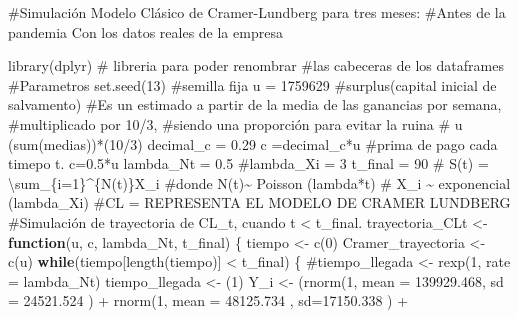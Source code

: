 \documentclass[
  us-letterpaper,
]{scrreprt}
\newenvironment{Shaded}{\begin{snugshade}}{\end{snugshade}}
\newcommand{\AttributeTok}[1]{\textcolor[rgb]{0.40,0.45,0.13}{#1}}
\newcommand{\CommentTok}[1]{\textcolor[rgb]{0.37,0.37,0.37}{#1}}
\newcommand{\ControlFlowTok}[1]{\textcolor[rgb]{0.00,0.23,0.31}{\textbf{#1}}}
\newcommand{\DecValTok}[1]{\textcolor[rgb]{0.68,0.00,0.00}{#1}}
\newcommand{\FloatTok}[1]{\textcolor[rgb]{0.68,0.00,0.00}{#1}}
\newcommand{\FunctionTok}[1]{\textcolor[rgb]{0.28,0.35,0.67}{#1}}
\newcommand{\NormalTok}[1]{\textcolor[rgb]{0.00,0.23,0.31}{#1}}
\newcommand{\OtherTok}[1]{\textcolor[rgb]{0.00,0.23,0.31}{#1}}
\newcommand{\SpecialCharTok}[1]{\textcolor[rgb]{0.37,0.37,0.37}{#1}}
\theoremstyle{plain}
\theoremstyle{plain}
\theoremstyle{definition}
\theoremstyle{remark}
\begin{document}
\begin{Shaded}
\begin{Highlighting}[]
\CommentTok{\#Simulación Modelo Clásico de Cramer{-}Lundberg para tres meses: }
\CommentTok{\#Antes de la pandemia Con los datos reales de la empresa}

\FunctionTok{library}\NormalTok{(dplyr) }\CommentTok{\# libreria para poder renombrar }
\CommentTok{\#las cabeceras de los dataframes}
\CommentTok{\#Parametros}
\FunctionTok{set.seed}\NormalTok{(}\DecValTok{13}\NormalTok{) }\CommentTok{\#semilla fija}
\NormalTok{u }\OtherTok{=} \DecValTok{1759629} \CommentTok{\#surplus(capital inicial de salvamento)}
\CommentTok{\#Es un estimado a partir de la media de las ganancias por semana, }
\CommentTok{\#multiplicado por 10/3, }
\CommentTok{\#siendo una proporción para evitar la ruina}
\CommentTok{\# u (sum(medias))*(10/3)}
\NormalTok{decimal\_c }\OtherTok{=} \FloatTok{0.29}
\NormalTok{c }\OtherTok{=}\NormalTok{decimal\_c}\SpecialCharTok{*}\NormalTok{u }\CommentTok{\#prima de pago cada timepo t. c=0.5*u}
\NormalTok{lambda\_Nt }\OtherTok{=} \FloatTok{0.5}
\CommentTok{\#lambda\_Xi = 3}
\NormalTok{t\_final }\OtherTok{=} \DecValTok{90}
\CommentTok{\# S(t) = \textbackslash{}sum\_\{i=1\}\^{}\{N(t)\}X\_i}
\CommentTok{\#donde N(t)\textasciitilde{} Poisson (lambda*t)}
\CommentTok{\# X\_i \textasciitilde{} exponencial (lambda\_Xi)}
\CommentTok{\#CL = REPRESENTA EL MODELO DE CRAMER LUNDBERG}
\CommentTok{\#Simulación de trayectoria de CL\_t, cuando t \textless{} t\_final.}
\NormalTok{trayectoria\_CLt }\OtherTok{\textless{}{-}} \ControlFlowTok{function}\NormalTok{(u, c, lambda\_Nt, t\_final)}
\NormalTok{\{}
\NormalTok{  tiempo }\OtherTok{\textless{}{-}} \FunctionTok{c}\NormalTok{(}\DecValTok{0}\NormalTok{)}
\NormalTok{  Cramer\_trayectoria }\OtherTok{\textless{}{-}} \FunctionTok{c}\NormalTok{(u)}
  \ControlFlowTok{while}\NormalTok{(tiempo[}\FunctionTok{length}\NormalTok{(tiempo)] }\SpecialCharTok{\textless{}}\NormalTok{ t\_final)}
\NormalTok{  \{}
    \CommentTok{\#tiempo\_llegada \textless{}{-} rexp(1, rate = lambda\_Nt)}
\NormalTok{    tiempo\_llegada }\OtherTok{\textless{}{-}}\NormalTok{ (}\DecValTok{1}\NormalTok{)}
\NormalTok{    Y\_i }\OtherTok{\textless{}{-}}\NormalTok{  (}\FunctionTok{rnorm}\NormalTok{(}\DecValTok{1}\NormalTok{, }\AttributeTok{mean =} \FloatTok{139929.468}\NormalTok{, }\AttributeTok{sd =} \FloatTok{24521.524}\NormalTok{ ) }\SpecialCharTok{+}
            \FunctionTok{rnorm}\NormalTok{(}\DecValTok{1}\NormalTok{, }\AttributeTok{mean =} \FloatTok{48125.734}\NormalTok{ , }\AttributeTok{sd=}\FloatTok{17150.338}\NormalTok{ )    }\SpecialCharTok{+}  

\end{Highlighting}
\end{Shaded}
\end{document}
